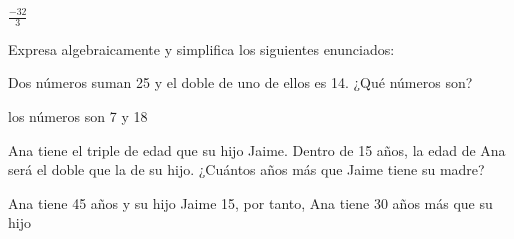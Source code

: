 \documentclass[addpoints,spanish, 12pt,a4paper]{exam}
\begin{document}
\begin{questions}
\begin{parts}
\begin{solution} $\frac{-32}{3}$\end{solution}



\end{parts}
\addpoints

\question Expresa algebraicamente y simplifica los siguientes enunciados:


\question[2] Dos números suman 25 y el doble de uno de ellos es 14. ¿Qué números son? 
\begin{solution} los números son 7 y 18\end{solution}

\question[2] Ana tiene el triple de edad que su hijo Jaime. Dentro de 15 años, la edad de Ana será el doble que la de su hijo. ¿Cuántos años más que Jaime tiene su madre?
\begin{solution} Ana tiene 45 años y su hijo Jaime 15, por tanto, Ana tiene 30 años más que su hijo\end{solution}






\addpoints

\end{questions}
\end{document}
